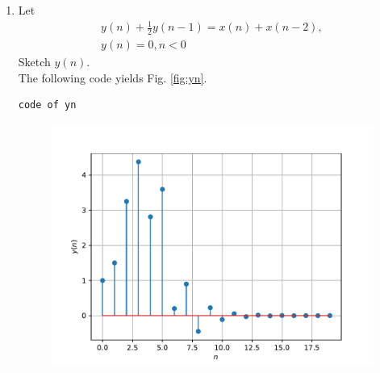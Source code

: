 \documentclass[journal,12pt,twocolumn]{IEEEtran}
\renewcommand\thesection{\arabic{section}}
\begin{document}
\begin{enumerate}[label=\thesection.\arabic*,ref=\thesection.\theenumi]
\item Let
\begin{multline}
\label{eq:iir_filter}
y(n) + \frac{1}{2}y(n-1) = x(n) + x(n-2), 
\\
 y(n) = 0, n < 0
\end{multline}
Sketch $y(n)$.
\\
\solution The following code yields Fig. \ref{fig:yn}.
\begin{lstlisting}
code of yn
\end{lstlisting}
\begin{figure}[!ht]
\begin{center}
\includegraphics[width=\columnwidth]{figs/q3/yn.pdf}
\end{center}
\label{fig:xnyn}	
\end{figure}
\end{enumerate}
\end{document}
